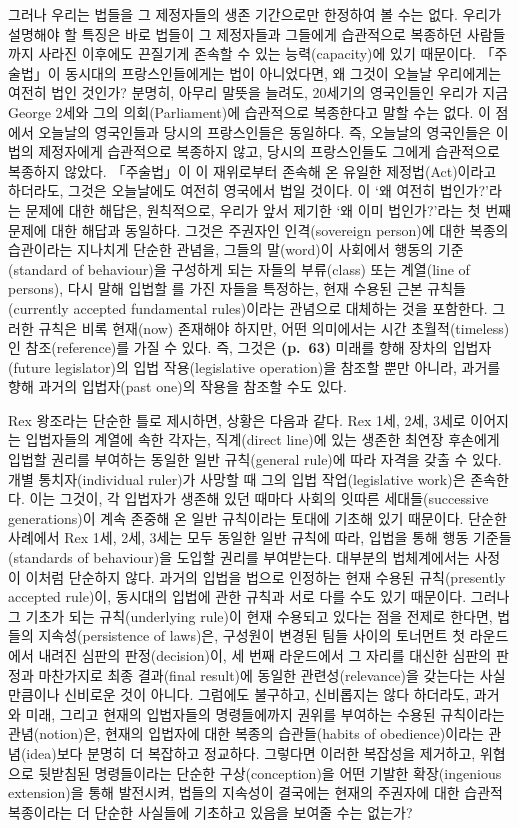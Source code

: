 그러나 우리는 법들을 그 제정자들의 생존 기간으로만 한정하여 볼 수는
없다. 우리가 설명해야 할 특징은 바로 법들이 그 제정자들과 그들에게
습관적으로 복종하던 사람들까지 사라진 이후에도 끈질기게 존속할 수 있는
능력(capacity)에 있기 때문이다. 「주술법」이 동시대의 프랑스인들에게는
법이 아니었다면, 왜 그것이 오늘날 우리에게는 여전히 법인 것인가? 분명히,
아무리 말뜻을 늘려도, 20세기의 영국인들인 우리가 지금 George 2세와 그의
의회(Parliament)에 습관적으로 복종한다고 말할 수는 없다. 이 점에서
오늘날의 영국인들과 당시의 프랑스인들은 동일하다. 즉, 오늘날의
영국인들은 이 법의 제정자에게 습관적으로 복종하지 않고, 당시의
프랑스인들도 그에게 습관적으로 복종하지 않았다. 「주술법」이 이
재위로부터 존속해 온 유일한 제정법(Act)이라고 하더라도, 그것은
오늘날에도 여전히 영국에서 법일 것이다. 이 ‘왜 여전히 법인가?’라는
문제에 대한 해답은, 원칙적으로, 우리가 앞서 제기한 ‘왜 이미 법인가?’라는
첫 번째 문제에 대한 해답과 동일하다. 그것은 주권자인 인격(sovereign
person)에 대한 복종의 습관이라는 지나치게 단순한 관념을, 그들의
말(word)이 사회에서 행동의 기준(standard of behaviour)을 구성하게 되는
자들의 부류(class) 또는 계열(line of persons), 다시 말해 입법할
를 가진 자들을 특정하는, 현재 수용된 근본
규칙들(currently accepted fundamental rules)이라는 관념으로 대체하는
것을 포함한다. 그러한 규칙은 비록 현재(now) 존재해야 하지만, 어떤
의미에서는 시간 초월적(timeless)인 참조(reference)를 가질 수 있다. 즉,
그것은 \textbf{(p.~63)} 미래를 향해 장차의 입법자(future legislator)의
입법 작용(legislative operation)을 참조할 뿐만 아니라, 과거를 향해
과거의 입법자(past one)의 작용을 참조할 수도 있다.

Rex 왕조라는 단순한 틀로 제시하면, 상황은 다음과 같다. Rex 1세, 2세,
3세로 이어지는 입법자들의 계열에 속한 각자는, 직계(direct line)에 있는
생존한 최연장 후손에게 입법할 권리를 부여하는 동일한 일반 규칙(general
rule)에 따라 자격을 갖출 수 있다. 개별 통치자(individual ruler)가 사망할
때 그의 입법 작업(legislative work)은 존속한다. 이는 그것이, 각 입법자가
생존해 있던 때마다 사회의 잇따른 세대들(successive generations)이 계속
존중해 온 일반 규칙이라는 토대에 기초해 있기 때문이다. 단순한 사례에서
Rex 1세, 2세, 3세는 모두 동일한 일반 규칙에 따라, 입법을 통해 행동
기준들(standards of behaviour)을 도입할 권리를 부여받는다. 대부분의
법체계에서는 사정이 이처럼 단순하지 않다. 과거의 입법을 법으로 인정하는
현재 수용된 규칙(presently accepted rule)이, 동시대의 입법에 관한 규칙과
서로 다를 수도 있기 때문이다. 그러나 그 기초가 되는 규칙(underlying
rule)이 현재 수용되고 있다는 점을 전제로 한다면, 법들의
지속성(persistence of laws)은, 구성원이 변경된 팀들 사이의 토너먼트 첫
라운드에서 내려진 심판의 판정(decision)이, 세 번째 라운드에서 그 자리를
대신한 심판의 판정과 마찬가지로 최종 결과(final result)에 동일한
관련성(relevance)을 갖는다는 사실만큼이나 신비로운 것이 아니다. 그럼에도
불구하고, 신비롭지는 않다 하더라도, 과거와 미래, 그리고 현재의
입법자들의 명령들에까지 권위를 부여하는 수용된 규칙이라는
관념(notion)은, 현재의 입법자에 대한 복종의 습관들(habits of
obedience)이라는 관념(idea)보다 분명히 더 복잡하고 정교하다. 그렇다면
이러한 복잡성을 제거하고, 위협으로 뒷받침된 명령들이라는 단순한
구상(conception)을 어떤 기발한 확장(ingenious extension)을 통해
발전시켜, 법들의 지속성이 결국에는 현재의 주권자에 대한 습관적
복종이라는 더 단순한 사실들에 기초하고 있음을 보여줄 수는 없는가?

